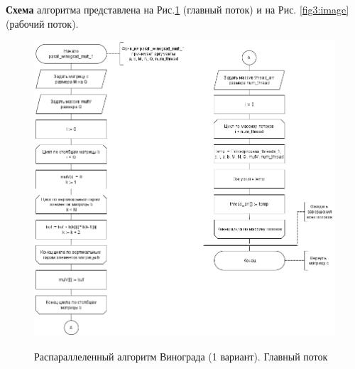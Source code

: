 \textbf{Схема} алгоритма представлена на Рис.\ref{fig2:image} (главный поток) и на Рис. \ref{fig3:image} (рабочий поток).\\
\begin{figure}[h]
	\begin{center}
		{\includegraphics[scale = 0.58]{schemes/parall_1_main}}
		\caption{Распараллеленный алгоритм Винограда (1 вариант). Главный поток}
		\label{fig2:image}
	\end{center}
\end{figure}

